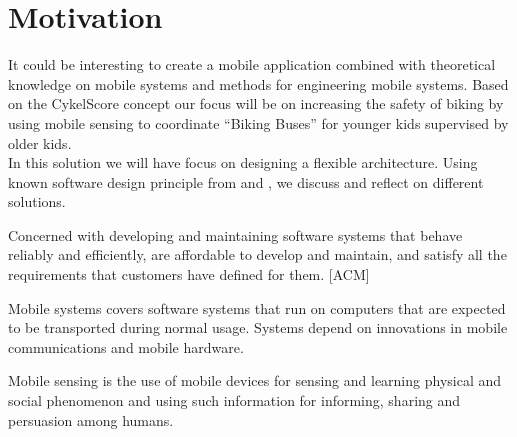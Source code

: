 \section{Motivation} It could be interesting to create a mobile application combined with theoretical knowledge on mobile systems and methods for engineering mobile systems. Based on the CykelScore concept our focus will be on increasing the safety of biking by using mobile sensing to coordinate “Biking Buses” for younger kids supervised by older kids.   \\


 In this solution we will have focus on designing a flexible architecture. Using known software design principle from \cite{Bass} and \cite{Baerbak10}, we discuss and reflect on different solutions.
 
 
\begin{defi}
Concerned with developing and maintaining software systems that behave reliably and efficiently, are affordable to develop and maintain,
and satisfy all the requirements that customers have defined for them. [ACM]
\end{defi}


\begin{defi}
Mobile systems covers software systems that run on computers that are expected to be transported during normal usage. Systems depend on innovations in mobile
communications and mobile hardware.
\end{defi}


\begin{defi}
Mobile sensing is the use of mobile devices for sensing and learning physical and social phenomenon and using such information for
informing, sharing and persuasion among humans.
\end{defi}


